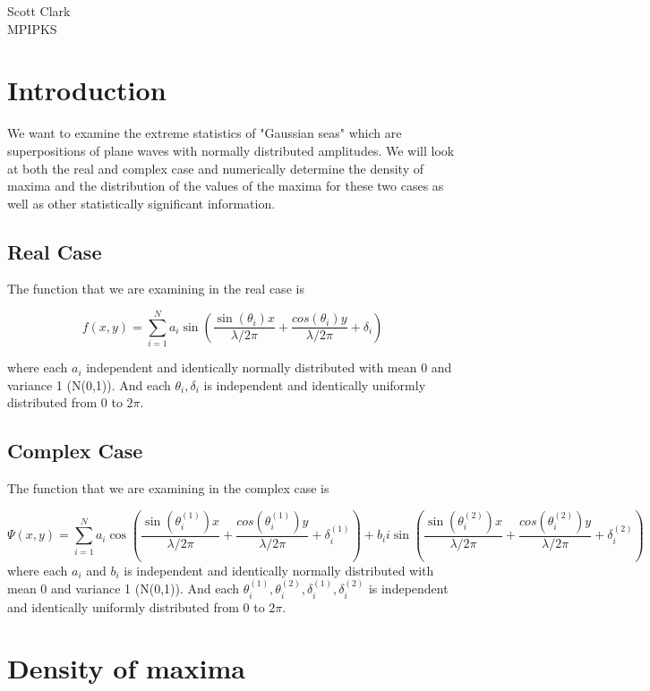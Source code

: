 \documentclass[12pt]{article}
\begin{document}
\begin{flushleft}
Scott Clark \\
MPIPKS
\end{flushleft}

\section{Introduction}

We want to examine the extreme statistics of "Gaussian seas" which are superpositions of plane waves with normally distributed amplitudes. We will look at both the real and complex case and numerically determine the density of maxima and the distribution of the values of the maxima for these two cases as well as other statistically significant information.

\subsection{Real Case}

The function that we are examining in the real case is

\[f(x,y) = \sum_{i = 1}^{N} a_{i} \sin \left(\frac{\sin(\theta_{i}) x}{\lambda/2 \pi} + \frac{cos(\theta_{i}) y}{\lambda/2 \pi} + \delta_{i} \right)\]

where each $a_{i}$ independent and identically normally distributed with mean 0 and variance 1 (N(0,1)). And each $\theta_{i}, \delta_{i}$ is independent and identically uniformly distributed from 0 to $2\pi$.

\subsection{Complex Case}

The function that we are examining in the complex case is

\[\Psi(x,y) = \sum_{i = 1}^{N} a_{i} \cos \left(\frac{\sin(\theta_{i}^{(1)}) x}{\lambda/2 \pi} + \frac{cos(\theta_{i}^{(1)}) y}{\lambda/2 \pi} + \delta_{i}^{(1)} \right) + b_{i} i \sin \left(\frac{\sin(\theta_{i}^{(2)}) x}{\lambda/2 \pi} + \frac{cos(\theta_{i}^{(2)}) y}{\lambda/2 \pi} + \delta_{i}^{(2)} \right)\]
where each $a_{i}$ and $b_{i}$ is independent and identically normally distributed with mean 0 and variance 1 (N(0,1)). And each $\theta_{i}^{(1)}, \theta_{i}^{(2)}, \delta_{i}^{(1)}, \delta_{i}^{(2)}$ is independent and identically uniformly distributed from 0 to $2\pi$.

\section{Density of maxima}
\end{document}
